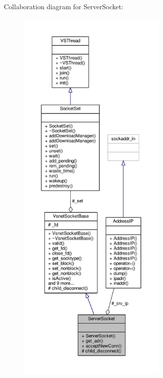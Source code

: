 Collaboration diagram for Server\+Socket\+:
\nopagebreak
\begin{figure}[H]
\begin{center}
\leavevmode
\includegraphics[height=550pt]{d3/dc3/structServerSocket__coll__graph}
\end{center}
\end{figure}
